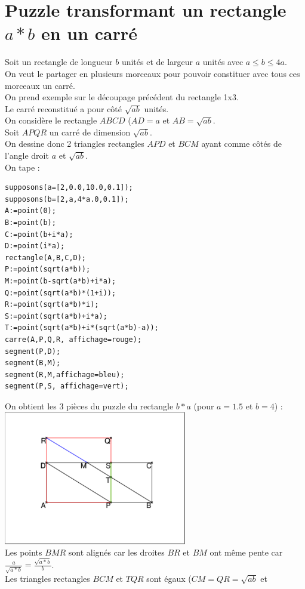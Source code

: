 \documentclass[a4paper,11pt]{book}
\begin{document}
\section{Puzzle transformant un rectangle $a*b$ en un carr\'e}\label{sec:carreab}
Soit un rectangle de longueur $b$ unit\'es et de largeur $a$ unit\'es avec 
$a\leq b \leq 4a$.\\
On veut le partager en plusieurs morceaux pour pouvoir constituer avec 
tous ces morceaux un carr\'e.\\
On prend exemple sur le d\'ecoupage pr\'ec\'edent du rectangle 1x3.\\
Le carr\'e reconstitu\'e a pour c\^ot\'e $\sqrt{ab}$ unit\'es.\\
On consid\`ere le rectangle $ABCD$ ($AD=a$ et $AB=\sqrt{ab}$.\\
 Soit $APQR$ un carr\'e de dimension $\sqrt{ab}$.\\
On dessine donc 2 triangles rectangles $APD$ et $BCM$ ayant comme c\^ot\'es de 
l'angle droit $a$ et $\sqrt{ab}$.\\
On tape :
\begin{verbatim}
supposons(a=[2,0.0,10.0,0.1]);
supposons(b=[2,a,4*a.0,0.1]);
A:=point(0);
B:=point(b);
C:=point(b+i*a);
D:=point(i*a);
rectangle(A,B,C,D);
P:=point(sqrt(a*b));
M:=point(b-sqrt(a*b)+i*a);
Q:=point(sqrt(a*b)*(1+i));
R:=point(sqrt(a*b)*i);
S:=point(sqrt(a*b)+i*a);
T:=point(sqrt(a*b)+i*(sqrt(a*b)-a));
carre(A,P,Q,R, affichage=rouge);
segment(P,D);
segment(B,M);
segment(R,M,affichage=bleu);
segment(P,S, affichage=vert);
\end{verbatim}
On obtient les 3 pi\`eces du puzzle du rectangle $b*a$ (pour $a=1.5$ et $b=4$) :\\
\includegraphics[width=8cm]{carresqrta2}\\
Les points $BMR$ sont align\'es car les droites $BR$ et $BM$ ont m\^eme 
pente car $\frac{a}{\sqrt{a*b}}=\frac{\sqrt{a*b}}{b}$.\\
Les triangles rectangles $BCM$ et $TQR$ sont \'egaux ($CM=QR=\sqrt{ab}$ et 
\end{document}
